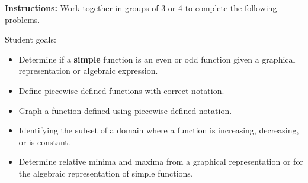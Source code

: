 


\noindent \textbf{Instructions:} Work together in groups of 3 or 4 to
complete the following problems.

\noindent
Student goals:
  \begin{itemize}
  \item Determine if a \textbf{simple} function is an even or odd
    function given a graphical representation or algebraic expression.
  \item Define piecewise defined functions with correct notation.
  \item Graph a function defined using piecewise defined notation.
  \item Identifying the subset of a domain where a function is increasing, decreasing, or is constant.
  \item Determine relative minima and maxima from a graphical
    representation or for the algebraic representation of simple
    functions.
  \end{itemize}



